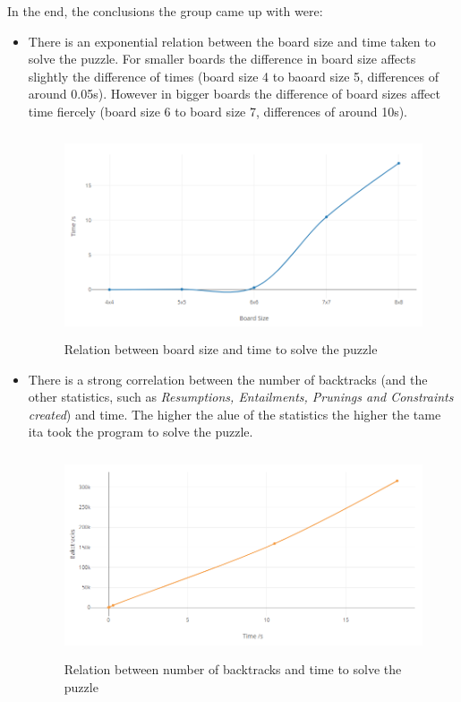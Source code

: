 \documentclass{llncs}
\begin{document}
In the end, the conclusions the group came up with were:
\begin{itemize}
	\item There is an exponential relation between the board size and time taken to solve the puzzle. For smaller boards the difference in board size affects slightly the difference of times (board size 4 to baoard size 5, differences of around 0.05s). However in bigger boards the difference of board sizes affect time fiercely (board size 6 to board size 7, differences of around 10s).

\begin{figure}[h!]
\begin{center}
\includegraphics[height=6cm,width=12cm]{images/graph1.png}
\caption{Relation between board size and time to solve the puzzle}
\label{Figure 5}
\end{center}
\end{figure}

	\item There is a strong correlation between the number of backtracks (and the other statistics, such as \textit{Resumptions, Entailments, Prunings and Constraints created}) and time. The higher the alue of the statistics the higher the tame ita took the program to solve the puzzle.

\begin{figure}[h!]
\begin{center}
\includegraphics[height=6cm,width=12cm]{images/graph2.png}
\caption{Relation between number of backtracks and time to solve the puzzle}
\label{Figure 6}
\end{center}
\end{figure}
	

\end{itemize}
\end{document}
